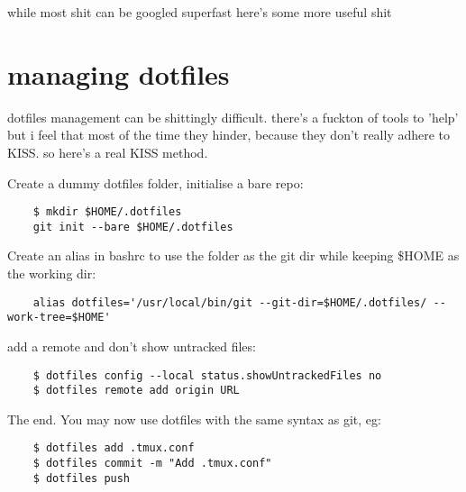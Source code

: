 while most shit can be googled superfast here's some more useful shit

\section{managing dotfiles}%
\label{sec:managing_dotfiles}

dotfiles management can be shittingly difficult. there's a fuckton of tools  to 'help' but i feel that most of the time they hinder, because they don't really adhere to KISS. so here's a real KISS method.

Create a dummy dotfiles folder, initialise a bare repo:
\begin{verbatim}
	$ mkdir $HOME/.dotfiles
	git init --bare $HOME/.dotfiles
\end{verbatim}

Create an alias in bashrc to use the folder as the git dir while keeping \$HOME as the working dir:
\begin{verbatim}
	alias dotfiles='/usr/local/bin/git --git-dir=$HOME/.dotfiles/ --work-tree=$HOME'
\end{verbatim}

add a remote and don't show untracked files:
\begin{verbatim}
	$ dotfiles config --local status.showUntrackedFiles no
	$ dotfiles remote add origin URL
\end{verbatim}

The end. You may now use dotfiles with the same syntax as git, eg:
\begin{verbatim}
	$ dotfiles add .tmux.conf
	$ dotfiles commit -m "Add .tmux.conf"
	$ dotfiles push
\end{verbatim}
